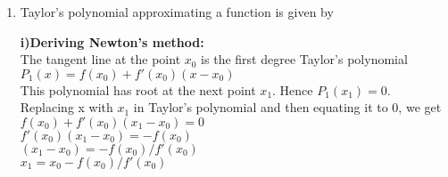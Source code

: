 

\def\semester{Ananya Jana}
\def\course{netID: aj611}




\begin{enumerate}
\item Taylor's polynomial approximating a function is given by
{\bf i)Deriving Newton's method:}\\The tangent line at the point $x_0$ is the first degree Taylor's polynomial $P_1(x) = f(x_0) +
f'(x_0 )(x - x_0 )$\\
This polynomial has root at the next point $x_1$. Hence $P_1(x_1)= 0$.\\ Replacing x with $x_1$ in Taylor's polynomial and then equating it to 0, we get $f(x_0) + f'(x_0 )(x_1 - x_0 ) = 0$\\
$f'(x_0 )(x_1 - x_0 ) = -f(x _0)$\\
$(x_1 - x_0 ) = -f(x_0)/f'(x_0 )$\\
$x_1 = x_0 -f(x_0)/f'(x_0 )$\\


\end{enumerate}
